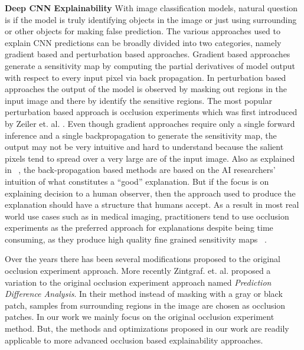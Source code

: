 \vspace{2mm}
\noindent \textbf{Deep CNN Explainability} With image classification models, natural question is if the model is truly identifying objects in the image or just using surrounding or other objects for making false prediction.
The various approaches used to explain CNN predictions can be broadly divided into two categories, namely gradient based and perturbation based approaches. Gradient based approaches generate a sensitivity map by computing the partial derivatives of model output with respect to every input pixel via back propagation.
In perturbation based approaches the output of the model is observed by masking out regions in the input image and there by identify the sensitive regions. The most popular perturbation based approach is occlusion experiments which was first introduced by Zeiler et. al. \cite{zeiler2014visualizing}.
Even though gradient approaches require only a single forward inference and a single backpropagation to generate the sensitivity map, the output may not be very intuitive and hard to understand because the salient pixels tend to spread over a very large are of the input image.
Also as explained in ~\cite{miller2017explanation}, the back-propagation based methods are based on the AI researchers’ intuition of what constitutes a “good” explanation. But if the focus is on explaining decision to a human observer, then the approach used to produce the explanation should have a structure that humans accept.
As a result in most real world use cases such as in medical imaging, practitioners tend to use occlusion experiments as the preferred approach for explanations despite being time consuming, as they produce high quality fine grained sensitivity maps ~\cite{jung2017deep}.

Over the years there has been several modifications proposed to the original occlusion experiment approach. More recently Zintgraf. et. al. \cite{zintgraf2017visualizing} proposed a variation to the original occlusion experiment approach named \textit{Prediction Difference Analysis}. In their method instead of masking with a gray or black patch, samples from surrounding regions in the image are chosen as occlusion patches.
In our work we mainly focus on the original occlusion experiment method. But, the methods and optimizations proposed in our work are readily applicable to more advanced occlusion based explainability approaches.